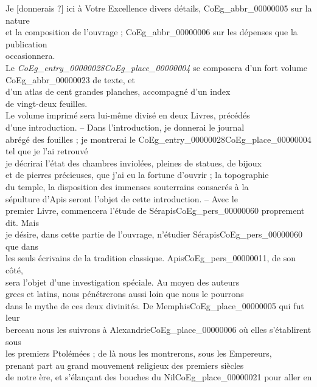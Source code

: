 \documentclass{book}
\begin{document}
Je [donnerais ?] ici à Votre Excellence divers détails, \gls{CoEg_abbr_00000005} sur la nature\\
et la composition de l’ouvrage ; \gls{CoEg_abbr_00000006} sur les dépenses que la publication\\
occasionnera.\\
\indent Le \textit{\Gls{CoEg_entry_00000028}\gls{CoEg_place_00000004}} se composera d’un fort volume \gls{CoEg_abbr_00000023} de texte, et\\
d’un atlas de cent grandes planches, accompagné d’un index\\
de vingt-deux feuilles.\\
\indent Le volume imprimé sera lui-même divisé en deux Livres, précédés\\
d’une introduction. – Dans l’introduction, je donnerai le journal\\
abrégé des fouilles ; je montrerai le \Gls{CoEg_entry_00000028}\gls{CoEg_place_00000004} tel que je l’ai retrouvé\\
je décrirai l’état des chambres inviolées, pleines de statues, de bijoux\\
et de pierres précieuses, que j’ai eu la fortune d’ouvrir ; la topographie\\
du temple, la disposition des immenses souterrains consacrés à la\\
sépulture d’Apis seront l’objet de cette introduction. – Avec le\\
premier Livre, commencera l’étude de Sérapis\gls{CoEg_pers_00000060} proprement dit. Mais\\
je désire, dans cette partie de l’ouvrage, n’étudier Sérapis\gls{CoEg_pers_00000060} que dans\\
les seuls écrivains de la tradition classique. Apis\gls{CoEg_pers_00000011}, de son côté,\\
sera l’objet d’une investigation spéciale. Au moyen des auteurs\\
grecs et latins, nous pénétrerons aussi loin que nous le pourrons\\
dans le mythe de ces deux divinités. De Memphis\gls{CoEg_place_00000005} qui fut leur\\
berceau nous les suivrons à Alexandrie\gls{CoEg_place_00000006} où elles s’établirent sous\\
les premiers Ptolémées ; de là nous les montrerons, sous les Empereurs,\\
prenant part au grand mouvement religieux des premiers siècles\\
de notre ère, et s’élançant des bouches du Nil\gls{CoEg_place_00000021} pour aller en\\
\end{document}
